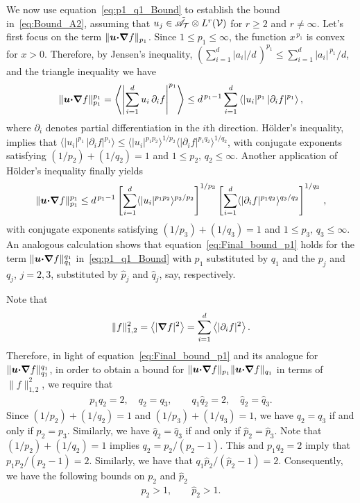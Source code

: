 \documentclass[amsa]{ipart}
\begin{document}
We now use equation~\eqref{eq:p1_q1_Bound} to establish the bound
in~\eqref{eq:Bound_A2}, assuming that
$u_j\in\tilde{\mathscr{A}}_{\mathcal{T}}\otimes L^r(\mathcal{V})$ for $r\geq2$ and
$r\neq\infty$. Let's first focus 
on the term $\|\boldsymbol{u}\mbox{\boldmath${\cdot}$}\mbox{\boldmath${\nabla}$} f\|_{p_1}$.  Since $1\leq p_1\leq\infty$,
the function $x^{\,p_1}$ is convex for $x>0$. Therefore, by Jensen's
inequality, $(\sum_{i=1}^d|a_i|/d\,)^{p_1}\leq\sum_{i=1}^d|a_i|^{\,p_1}/d$, and the
triangle inequality we have
%
\begin{align}
  \|\vecu\bcdot\bnabla f\|^{p_1}_{p_1}
  =\left\langle\left|\sum_{i=1}^du_i\,\partial_if\right|^{p_1}\right\rangle
  \leq d^{\,p_1-1}\sum_{i=1}^d\left\langle|u_i|^{p_1}\,|\partial_if|^{p_1} \right\rangle,
\end{align}
%
where $\partial_i$ denotes partial differentiation in the $i$th
direction. H{\"o}lder's inequality, implies that
$\langle|u_i|^{p_1}\,|\partial_if|^{p_1}\rangle\leq\langle|u_i|^{p_1p_2}\rangle^{1/p_2}\langle|\partial_if|^{p_1q_2}\rangle^{1/q_2}$,
with conjugate exponents satisfying $(1/p_2)+(1/q_2)=1$ and $1\leq
p_2,\,q_2\leq\infty$. 
Another application of H{\"o}lder's inequality finally yields
%
\begin{align}\label{eq:Final_bound_p1}
  \|\vecu\bcdot\bnabla f\|^{p_1}_{p_1}
  \leq d^{\,p_1-1}
   \left[\sum_{i=1}^d\langle|u_i|^{p_1p_2}\rangle^{p_3/p_2}\right]^{1/p_3}
   \left[\sum_{i=1}^d\langle|\partial_if|^{p_1q_2}\rangle^{q_3/q_2}\right]^{1/q_3}\,,
\end{align}
%
with conjugate exponents satisfying $(1/p_3)+(1/q_3)=1$ and $1\leq
p_3,\,q_3\leq\infty$.
An analogous calculation shows that equation~\eqref{eq:Final_bound_p1}
holds for the term $\|\boldsymbol{u}\mbox{\boldmath${\cdot}$}\mbox{\boldmath${\nabla}$} f\|^{q_1}_{q_1}$
in~\eqref{eq:p1_q1_Bound} with $p_1$ 
substituted by $q_1$ and the $p_j$ and $q_j$, $j=2,3$, substituted
by $\hat{p}_j$ and $\hat{q}_j$, say, respectively.




Note that
%
\begin{align}
  \|f\|^2_{1,2}=\left\langle|\bnabla f|^2\right\rangle=\sum_{i=1}^d\left\langle|\partial_if|^2\right\rangle.
\end{align}
%
Therefore, in light of equation~\eqref{eq:Final_bound_p1} and its
analogue for $\|\boldsymbol{u}\mbox{\boldmath${\cdot}$}\mbox{\boldmath${\nabla}$} f\|^{q_1}_{q_1}$, in order to obtain
a bound for $\|\boldsymbol{u}\mbox{\boldmath${\cdot}$}\mbox{\boldmath${\nabla}$} f\|_{p_1}\|\boldsymbol{u}\mbox{\boldmath${\cdot}$}\mbox{\boldmath${\nabla}$} f\|_{q_1}$
in terms of $\|f\|^2_{1,2}$, we require that
%
\begin{align}\label{eq:Restrictions_pi_qi}
  p_1q_2=2, \quad q_2=q_3,
  \qquad
  q_1\hat{q}_2=2, \quad \hat{q}_2=\hat{q}_3.
\end{align}
%
Since $(1/p_2)+(1/q_2)=1$ and $(1/p_3)+(1/q_3)=1$, we have
$q_2=q_3$ if and only if $p_2=p_3$. Similarly, we have
$\hat{q}_2=\hat{q}_3$ if and only if $\hat{p}_2=\hat{p}_3$. Note that
$(1/p_2)+(1/q_2)=1$ implies $q_2=p_2/(p_2-1)$. This and $p_1q_2=2$
imply that $p_1p_2/(p_2-1)=2$. Similarly, we have that
$q_1\hat{p}_2/(\hat{p}_2-1)=2$.
Consequently, we have the following bounds on $p_2$ and $\hat{p}_2$
%
\begin{align}\label{eq:p_2_gtr_1}
  p_2>1, \qquad \hat{p}_2>1.
\end{align}
%
\end{document}
